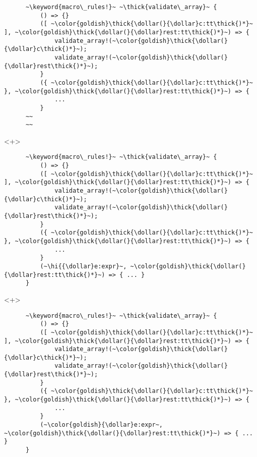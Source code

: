 \documentclass[usepdftitle=false,aspectratio=169]{beamer}
\newcommand{\dollar}{\makebox[\widthof{\$}][c]{\$}}
\newcommand{\thick}[1]{\contourlength{0.16pt}\contour[10]{black}{#1}}
\newcommand{\hi}[1]{%
\tikz[baseline=(A.base)]
 \node[highlighting=yellowbg,inner sep=0pt,text depth=0pt] (A) {#1};%
}
\newcommand{\keyword}[1]{\color{greenish}#1}
\begin{document}
\begin{frame}[fragile]
\begin{onlyenv}
\begin{verbatim}
      ~\keyword{macro\_rules!}~ ~\thick{validate\_array}~ {
          () => {}
          ([ ~\color{goldish}\thick{\dollar(}{\dollar}c:tt\thick{)*}~ ], ~\color{goldish}\thick{\dollar(}{\dollar}rest:tt\thick{)*}~) => {
              validate_array!(~\color{goldish}\thick{\dollar(}{\dollar}c\thick{)*}~);
              validate_array!(~\color{goldish}\thick{\dollar(}{\dollar}rest\thick{)*}~);
          }
          ({ ~\color{goldish}\thick{\dollar(}{\dollar}c:tt\thick{)*}~ }, ~\color{goldish}\thick{\dollar(}{\dollar}rest:tt\thick{)*}~) => {
              ...
          }
      ~~
      ~~
    \end{verbatim}
  \end{onlyenv}
  \begin{onlyenv}<+>
    \begin{verbatim}
      ~\keyword{macro\_rules!}~ ~\thick{validate\_array}~ {
          () => {}
          ([ ~\color{goldish}\thick{\dollar(}{\dollar}c:tt\thick{)*}~ ], ~\color{goldish}\thick{\dollar(}{\dollar}rest:tt\thick{)*}~) => {
              validate_array!(~\color{goldish}\thick{\dollar(}{\dollar}c\thick{)*}~);
              validate_array!(~\color{goldish}\thick{\dollar(}{\dollar}rest\thick{)*}~);
          }
          ({ ~\color{goldish}\thick{\dollar(}{\dollar}c:tt\thick{)*}~ }, ~\color{goldish}\thick{\dollar(}{\dollar}rest:tt\thick{)*}~) => {
              ...
          }
          (~\hi{{\dollar}e:expr}~, ~\color{goldish}\thick{\dollar(}{\dollar}rest:tt\thick{)*}~) => { ... }
      }
    \end{verbatim}
  \end{onlyenv}
  \begin{onlyenv}<+>
    \begin{verbatim}
      ~\keyword{macro\_rules!}~ ~\thick{validate\_array}~ {
          () => {}
          ([ ~\color{goldish}\thick{\dollar(}{\dollar}c:tt\thick{)*}~ ], ~\color{goldish}\thick{\dollar(}{\dollar}rest:tt\thick{)*}~) => {
              validate_array!(~\color{goldish}\thick{\dollar(}{\dollar}c\thick{)*}~);
              validate_array!(~\color{goldish}\thick{\dollar(}{\dollar}rest\thick{)*}~);
          }
          ({ ~\color{goldish}\thick{\dollar(}{\dollar}c:tt\thick{)*}~ }, ~\color{goldish}\thick{\dollar(}{\dollar}rest:tt\thick{)*}~) => {
              ...
          }
          (~\color{goldish}{\dollar}e:expr~, ~\color{goldish}\thick{\dollar(}{\dollar}rest:tt\thick{)*}~) => { ... }
      }
    \end{verbatim}
  \end{onlyenv}
\end{frame}
\end{document}
